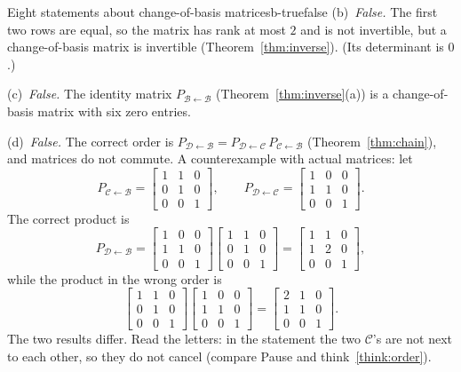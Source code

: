 \documentclass[11pt]{article}
\begin{document}
\begin{exmp}{Eight statements about change-of-basis matrices}{b-truefalse}
(b)~\emph{False.} The first two rows are equal, so the matrix has rank at most $2$ and is not invertible, but a change-of-basis matrix is invertible (Theorem~\ref{thm:inverse}). (Its determinant is $0$.)

(c)~\emph{False.} The identity matrix $P_{\mathcal{B}\leftarrow\mathcal{B}}$ (Theorem~\ref{thm:inverse}(a)) is a change-of-basis matrix with six zero entries.

(d)~\emph{False.} The correct order is $P_{\mathcal{D}\leftarrow\mathcal{B}}=P_{\mathcal{D}\leftarrow\mathcal{C}}\,P_{\mathcal{C}\leftarrow\mathcal{B}}$ (Theorem~\ref{thm:chain}), and matrices do not commute. A counterexample with actual matrices: let
\[
P_{\mathcal{C}\leftarrow\mathcal{B}}=\begin{bmatrix}1&1&0\\0&1&0\\0&0&1\end{bmatrix},\qquad P_{\mathcal{D}\leftarrow\mathcal{C}}=\begin{bmatrix}1&0&0\\1&1&0\\0&0&1\end{bmatrix}.
\]
The correct product is
\[
P_{\mathcal{D}\leftarrow\mathcal{B}}=\begin{bmatrix}1&0&0\\1&1&0\\0&0&1\end{bmatrix}\begin{bmatrix}1&1&0\\0&1&0\\0&0&1\end{bmatrix}=\begin{bmatrix}1&1&0\\1&2&0\\0&0&1\end{bmatrix},
\]
while the product in the wrong order is
\[
\begin{bmatrix}1&1&0\\0&1&0\\0&0&1\end{bmatrix}\begin{bmatrix}1&0&0\\1&1&0\\0&0&1\end{bmatrix}=\begin{bmatrix}2&1&0\\1&1&0\\0&0&1\end{bmatrix}.
\]
The two results differ. Read the letters: in the statement the two $\mathcal{C}$'s are not next to each other, so they do not cancel (compare Pause and think~\ref{think:order}).


\end{exmp}
\end{document}
